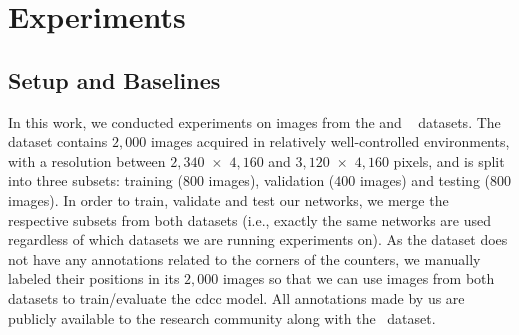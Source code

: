 \section{Experiments}
\label{sec:experiments}

\subsection{Setup and Baselines}
\label{sec:experiments-setup}

In this work, we conducted experiments on images from the \dataset and \ufpramr~\cite{laroca2019convolutional} datasets.
The \ufpramr dataset contains $2{,}000$ images acquired in relatively well-controlled environments, with a resolution between $2{,}340$~$\times$~$4{,}160$ and $3{,}120$~$\times$~$4{,}160$ pixels, and is split into three subsets: training ($800$ images), validation ($400$ images) and testing ($800$ images).
In order to train, validate and test our networks, we merge the respective subsets from both datasets (i.e., exactly the same networks are used regardless of which datasets we are running experiments on).
As the \ufpramr dataset does not have any annotations related to the corners of the counters, we manually labeled their positions in its $2{,}000$ images so that we can use images from both datasets to train/evaluate the \gls*{cdcc} model.
All annotations made by us are publicly available to the research community along with the \dataset~dataset. 


